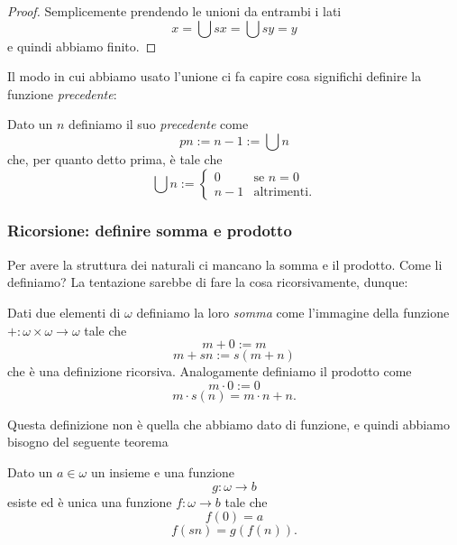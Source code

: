 \documentclass[11pt]{scrartcl}
\begin{document}
 	\begin{proof}
 		Semplicemente prendendo  le unioni da entrambi i lati
 		$$x=\bigcup sx = \bigcup sy=y$$
 		e quindi abbiamo finito.
 	\end{proof}
 	Il modo in cui abbiamo usato l'unione ci fa capire cosa significhi definire la funzione \textit{precedente}:
 	\begin{definition}
 		Dato un $n$ definiamo il suo \textit{precedente} come
 		$$pn:=n-1:=\bigcup n$$
 		che, per quanto detto prima, è tale che
 		$$\bigcup n:=\begin{cases}
 			0 & \text{se $n=0$} \\
 			n-1 & \text{altrimenti.}
 		\end{cases}$$ 
 	\end{definition}
 	\subsubsection{Ricorsione: definire somma e prodotto}
 	Per avere la struttura dei naturali ci mancano la somma e il prodotto. Come li definiamo? La tentazione sarebbe di fare la cosa ricorsivamente, dunque:
 	\begin{definition}
 		Dati due elementi di $\omega$ definiamo la loro \textit{somma} come l'immagine della funzione $+:\omega\times \omega\to \omega$ tale che
 		$$m+0:=m$$
 		$$m+sn:=s\left(m+n\right)$$
 		che è una definizione ricorsiva. Analogamente definiamo il prodotto come
 		$$m\cdot 0 := 0$$
 		$$m\cdot s(n)=m\cdot n + n.$$
 	\end{definition}
 	Questa definizione non è quella che abbiamo dato di funzione, e quindi abbiamo bisogno del seguente teorema
 	\begin{theorem}
 		Dato un $a\in \omega$ un insieme e una funzione 
 		$$g:\omega\to b$$
 		esiste ed è unica una funzione $f:\omega\to b$ tale che
 		$$f(0)=a$$
 		$$f(sn)=g(f(n)).$$
 	\end{theorem}
\end{document}
